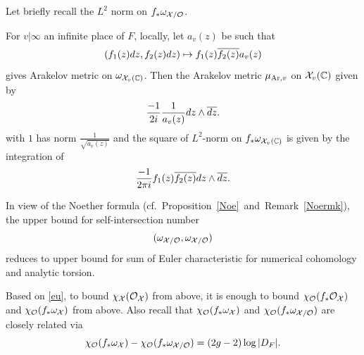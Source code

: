 \documentclass[]{amsart}
\newcommand{\BC}{{\mathbb {C}}} \newcommand{\BD}{{\mathbb {D}}}
\newcommand{\CO}{{\mathcal {O}}} \newcommand{\CP}{{\mathcal {P}}}
\theoremstyle{plain}
\theoremstyle{remark} \newtheorem{remark}[thm]{Remark}
\theoremstyle{remark} \newtheorem{exercise}{Exercise}
\theoremstyle{remark} \newtheorem{example}{Example}
\numberwithin{equation}{section}
\begin{document}
Let briefly recall the $L^2$ norm on $f_*\omega_{\CX/\CO}$.

For $v|\infty$ an infinite place of $F$,
locally, let $a_v(z)$ be such that \[(f_1(z)dz,f_2(z)dz)\mapsto f_1(z)\overline{f_2(z)}a_v(z)\] gives Arakelov metric on $\omega_{\CX_v(\BC)}$. 
Then the Arakelov metric $\mu_{{\mathrm{Ar}},v}$ on $\CX_v(\BC)$ given by \begin{equation}\label{arame}\frac{-1}{2 i}\frac{1}{a_v(z)}dz\wedge \overline{dz}.\end{equation} with $1$ has norm $\frac{1}{\sqrt{a_v(z)}}$ and the square of $L^2$-norm on $f_*\omega_{\CX_v(\BC)}$ is given by the integration of
\[\frac{-1}{2\pi i}f_1(z)\overline{f_2(z)}{dz\wedge \overline{dz}}.\]


In view of the Noether formula (cf.~Proposition~\ref{Noe}~and~Remark~\ref{Noermk}),
the upper bound for self-intersection number\[(\omega_{\CX/\CO},\omega_{\CX/\CO})\] reduces to upper bound for sum of Euler characteristic for numerical cohomology and analytic torsion.


Based on \eqref{eu}, to bound $\chi_{\CX}(\CO_{\CX})$ from above, it is enough to bound $\chi_{\CO}(f_*\CO_{\CX})$ and $\chi_{\CO}(f_*\omega_{\CX})$ from above.
Also recall that $\chi_{\CO}(f_*\omega_{\CX})$ and $\chi_{\CO}(f_*\omega_{\CX/\CO})$ are closely related via 
\begin{equation}\label{euabsre}\chi_{\CO}(f_*\omega_{\CX})-\chi_{\CO}(f_*\omega_{\CX/\CO})
  =(2g-2)\log |D_F|
 .\end{equation}
\end{document}
